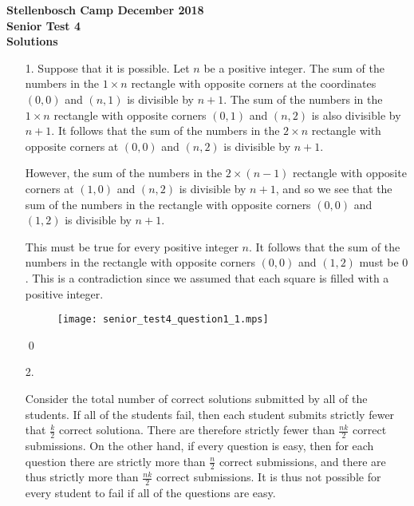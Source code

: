 \documentclass[a4paper, 12pt]{article}
\begin{document}
\begin{center}
\textbf{Stellenbosch Camp December 2018 \\ Senior Test 4} \\
\textbf{Solutions}
\end{center}
\vspace{5mm}

\begin{enumerate}
    
\item[1.] 
Suppose that it is possible. Let $n$ be a positive integer. The sum of the numbers in the $1 \times n$ rectangle with opposite corners at the coordinates $(0, 0)$ and $(n, 1)$ is divisible by $n + 1$. The sum of the numbers in the $1 \times n$ rectangle with opposite corners $(0, 1)$ and $(n, 2)$ is also divisible by $n + 1$. It follows that the sum of the numbers in the $2 \times n$ rectangle with opposite corners at $(0, 0)$ and $(n, 2)$ is divisible by $n + 1$.

However, the sum of the numbers in the $2 \times (n - 1)$ rectangle with opposite corners at $(1, 0)$ and $(n, 2)$ is divisible by $n + 1$, and so we see that the sum of the numbers in the rectangle with opposite corners $(0, 0)$ and $(1, 2)$ is divisible by $n + 1$.

This must be true for every positive integer $n$. It follows that the sum of the numbers in the rectangle with opposite corners $(0, 0)$ and $(1, 2)$ must be $0$. This is a contradiction since we assumed that each square is filled with a positive integer.

\begin{figure}[H]
\centering
\texttt{[image: senior\_test4\_question1\_1.mps]}
\end{figure}

\qed
\vspace{5mm}


\item[2.]

Consider the total number of correct solutions submitted by all of the students. If all of the students fail, then each student submits strictly fewer that $\frac{k}{2}$ correct solutiona. There are therefore strictly fewer than $\frac{nk}{2}$ correct submissions. On the other hand, if every question is easy, then for each question there are strictly more than $\frac{n}{2}$ correct submissions, and there are thus strictly more than $\frac{nk}{2}$ correct submissions. It is thus not possible for every student to fail if all of the questions are easy.


\end{enumerate}
\end{document}

